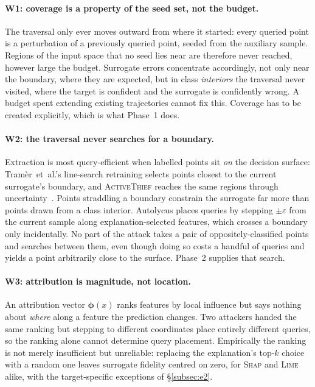 \documentclass[sigconf,anonymous,review]{acmart}
\begin{document}
\paragraph{W1: coverage is a property of the seed set, not the budget.}
The traversal only ever moves outward from where it started: every queried point is a perturbation of
a previously queried point, seeded from the auxiliary sample. Regions of the input space that no seed
lies near are therefore never reached, however large the budget. Surrogate errors concentrate accordingly, not only near the boundary, where they are expected, but in class \emph{interiors} the
traversal never visited, where the target is confident and the surrogate is confidently wrong. A
budget spent extending existing trajectories cannot fix this. Coverage has to be created explicitly,
which is what Phase~1 does.

\paragraph{W2: the traversal never searches for a boundary.}
Extraction is most query-efficient when labelled points sit \emph{on} the decision
surface: Tram\`er~et~al.'s line-search retraining selects points closest to the current surrogate's
boundary, and \textsc{ActiveThief} reaches the same regions through
uncertainty~\cite{tramer2016stealing,pal2020activethief}. Points straddling a boundary constrain the surrogate far more than
points drawn from a class interior. Autolycus places queries by stepping $\pm\varepsilon$ from the
current sample along explanation-selected features, which crosses a boundary only incidentally. No
part of the attack takes a pair of oppositely-classified points and searches between them, even though
doing so costs a handful of queries and yields a point arbitrarily close to the surface. Phase~2
supplies that search.

\paragraph{W3: attribution is magnitude, not location.}
An attribution vector $\boldsymbol{\phi}(x)$ ranks features by local influence but says nothing about
\emph{where} along a feature the prediction changes. Two attackers handed the same ranking but
stepping to different coordinates place entirely different queries, so the ranking alone cannot
determine query placement. Empirically the ranking is not merely insufficient but unreliable:
replacing the explanation's top-$k$ choice with a random one leaves surrogate fidelity centred on
zero, for \textsc{Shap} and \textsc{Lime} alike, with the target-specific exceptions of
\S\ref{subsec:e2}.
\end{document}
